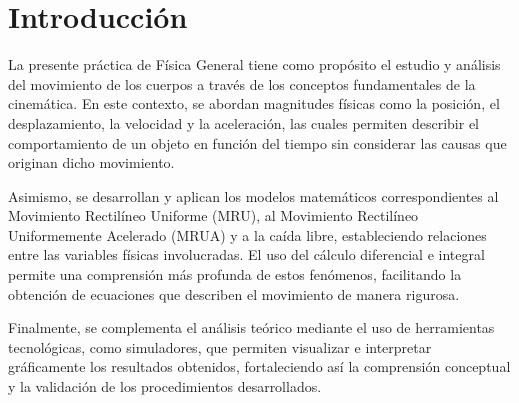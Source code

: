 \section{Introducción}
La presente práctica de Física General tiene como propósito el estudio y análisis del movimiento 
de los cuerpos a través de los conceptos fundamentales de la cinemática. En este contexto, 
se abordan magnitudes físicas como la posición, el desplazamiento, la velocidad y la aceleración, 
las cuales permiten describir el comportamiento de un objeto en función del tiempo 
sin considerar las causas que originan dicho movimiento.\\
\vspace{10pt}

Asimismo, se desarrollan y aplican los modelos matemáticos correspondientes al Movimiento Rectilíneo Uniforme (MRU), 
al Movimiento Rectilíneo Uniformemente Acelerado (MRUA) 
y a la caída libre, estableciendo relaciones entre las variables físicas involucradas. 
El uso del cálculo diferencial e integral permite una comprensión más profunda de estos fenómenos, 
facilitando la obtención de ecuaciones que describen el movimiento de manera rigurosa.\\
\vspace{10pt}

Finalmente, se complementa el análisis teórico mediante el uso de herramientas tecnológicas, 
como simuladores, que permiten visualizar e interpretar gráficamente los resultados obtenidos, 
fortaleciendo así la comprensión conceptual y la validación de los procedimientos desarrollados.